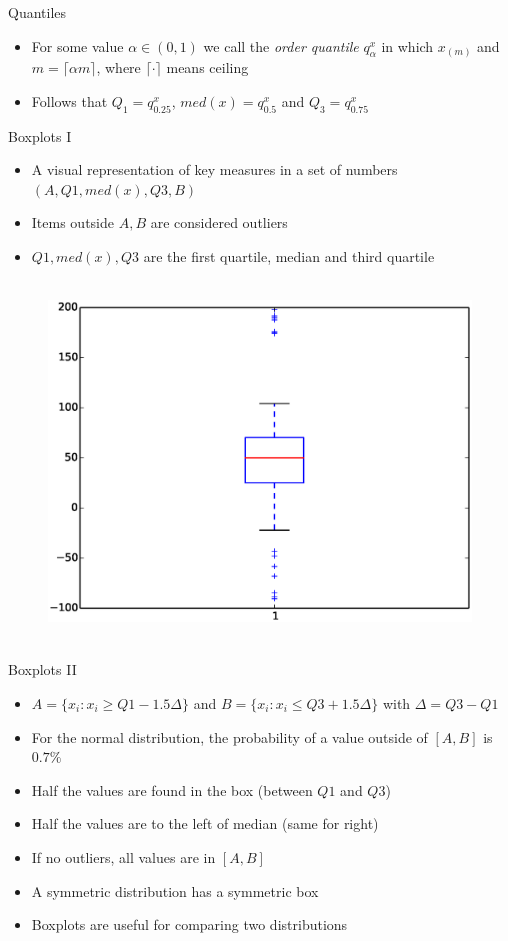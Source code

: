 \documentclass{beamer}
\begin{document}
\begin{frame}{Quantiles} 
\begin{itemize} 
 \item For some value $\alpha \in (0, 1)$ we call the \emph{order quantile} $q_\alpha^x$ in which $x_{(m)}$ and $m = \lceil \alpha m \rceil$, where $\lceil \cdot \rceil$ means ceiling
 \item Follows that $Q_1 = q_{0.25}^x$, $med(x) = q_{0.5}^x$ and $Q_3 = q_{0.75}^x$
\end{itemize}
\end{frame}

\begin{frame}{Boxplots I} 
\begin{itemize} 
 \item A visual representation of key measures in a set of numbers $(A, Q1, med(x), Q3, B)$ 
 \item Items outside $A, B$ are considered outliers 
 \item $Q1, med(x), Q3$ are the first quartile, median and third quartile 
\end{itemize}
  \begin{figure}[htp]
\mbox{
\includegraphics[width=0.5\linewidth]{BoxPlot.eps}
}
\end{figure} 
\end{frame}

\begin{frame}{Boxplots II} 
\begin{itemize} 
 \item $A = \{x_i : x_i \geq Q1 - 1.5\Delta \}$ and $B = \{x_i : x_i \leq Q3 + 1.5\Delta \}$ with $\Delta = Q3 - Q1$
 \item For the normal distribution, the probability of a value outside of $[A, B]$ is $0.7\%$
 \item Half the values are found in the box (between $Q1$ and $Q3$) 
 \item Half the values are to the left of median (same for right)
 \item If no outliers, all values are in $[A, B]$
 \item A symmetric distribution has a symmetric box
 \item Boxplots are useful for comparing two distributions 
\end{itemize}
\end{frame}
\end{document}
